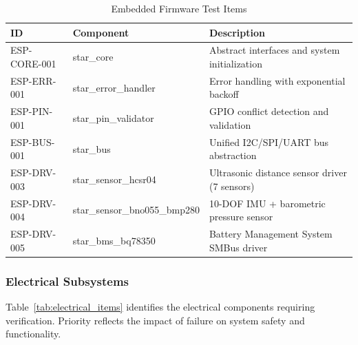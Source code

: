 \begin{table}[H]
    \centering
    \caption{Embedded Firmware Test Items}
    \label{tab:firmware_items}
    \begin{tabular}{@{}llp{5.5cm}@{}}
        \toprule
        \textbf{ID} & \textbf{Component} & \textbf{Description} \\
        \midrule
        ESP-CORE-001 & star\_core & Abstract interfaces and system initialization \\
        ESP-ERR-001 & star\_error\_handler & Error handling with exponential backoff \\
        ESP-PIN-001 & star\_pin\_validator & GPIO conflict detection and validation \\
        ESP-BUS-001 & star\_bus & Unified I2C/SPI/UART bus abstraction \\
        ESP-DRV-003 & star\_sensor\_hcsr04 & Ultrasonic distance sensor driver (7 sensors) \\
        ESP-DRV-004 & star\_sensor\_bno055\_bmp280 & 10-DOF IMU + barometric pressure sensor \\
        ESP-DRV-005 & star\_bms\_bq78350 & Battery Management System SMBus driver \\
        \bottomrule
    \end{tabular}
\end{table}

\subsubsection{Electrical Subsystems}

Table~\ref{tab:electrical_items} identifies the electrical components requiring verification. Priority reflects the impact of failure on system safety and functionality.

